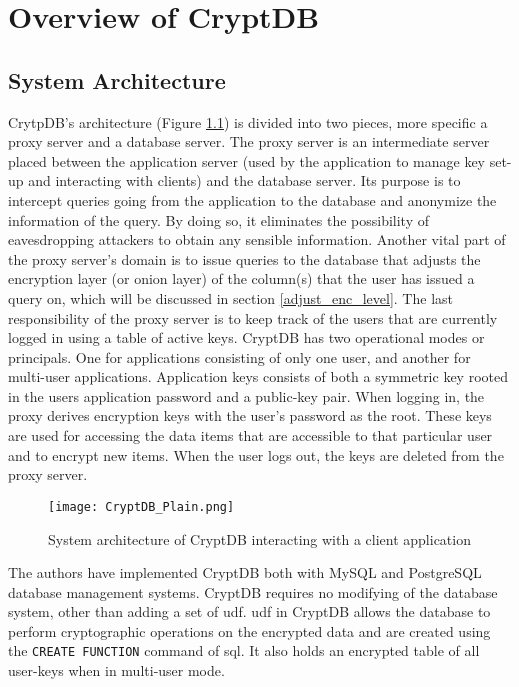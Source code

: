 \chapter{Overview of CryptDB}
\label{chp:overview_cryptDB}

\section{System Architecture}

CrytpDB's architecture (Figure \ref{cryptdb_plain}) is divided into two pieces, more specific a proxy server and a database server. The proxy server is an intermediate server placed between the application server (used by the application to manage key set-up and interacting with clients) and the database server. Its purpose is to intercept queries going from the application to the database and anonymize the information of the query. By doing so, it eliminates the possibility of eavesdropping attackers to obtain any sensible information. %
Another vital part of the proxy server's domain is to issue queries to the database that adjusts the encryption layer (or onion layer) of the column(s) that the user has issued a query on, which will be discussed in section \ref{adjust_enc_level}. The last responsibility of the proxy server is to keep track of the users that are currently logged in using a table of active keys. CryptDB has two operational modes or principals. One for applications consisting of only one user, and another for multi-user applications. Application keys consists of both a symmetric key rooted in the users application password and a public-key pair. When logging in, the proxy derives encryption keys with the user's password as the root. These keys are used for accessing the data items that are accessible to that particular user and to encrypt new items. When the user logs out, the keys are deleted from the proxy server.

\begin{figure}[h]
	\texttt{[image: CryptDB\_Plain.png]}
	\caption{System architecture of CryptDB interacting with a client application}
	\label{cryptdb_plain}
\end{figure}

The authors \citep{CryptDB_Main_Paper} have implemented CryptDB both with MySQL and PostgreSQL database management systems. CryptDB requires no modifying of the database system, other than adding a set of \Gls{udf}. \Gls{udf} in CryptDB allows the database to perform cryptographic operations on the encrypted data and are created using the \verb!CREATE FUNCTION! command of \gls{sql}. It also holds an encrypted table of all user-keys when in multi-user mode.

